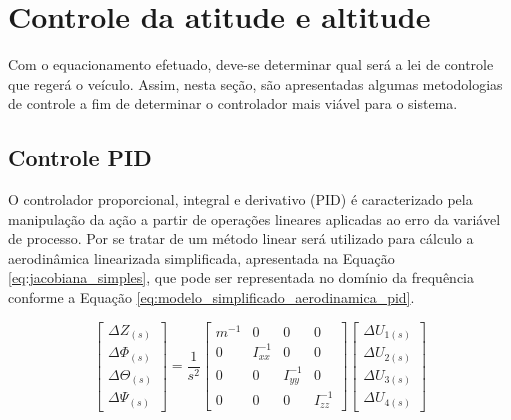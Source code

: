 \documentclass[main.tex]{subfiles}
\begin{document}
	
	\chapter{Controle da atitude e altitude}\label{chap:controle}
	
	Com o equacionamento efetuado, deve-se determinar qual será a lei de controle que regerá o veículo. Assim, nesta seção, são apresentadas algumas metodologias de controle a fim de determinar o controlador mais viável para o sistema.
	
	\section{Controle PID}\label{sec:controle_pid}
	
	O controlador proporcional, integral e derivativo (PID) é caracterizado pela manipulação da ação a partir de operações lineares aplicadas ao erro da variável de processo. Por se tratar de um método linear será utilizado para cálculo a aerodinâmica linearizada simplificada, apresentada na Equação \ref{eq:jacobiana_simples}, que pode ser representada no domínio da frequência conforme a Equação \ref{eq:modelo_simplificado_aerodinamica_pid}.
	
	\begin{equation}\label{eq:modelo_simplificado_aerodinamica_pid}
		\begin{bmatrix}
			\Delta Z_{(s)}\\
			\Delta \Phi_{(s)}\\
			\Delta \Theta_{(s)}\\
			\Delta \Psi_{(s)}
		\end{bmatrix} = \frac{1}{s^2}\begin{bmatrix}
			m^{-1} & 0 & 0 & 0\\
			
			0 & I_{xx}^{-1} & 0 & 0\\
			
			0 & 0 & I_{yy}^{-1} & 0\\
			
			0 & 0 & 0 & I_{zz}^{-1}
		\end{bmatrix}\begin{bmatrix}
			\Delta U_{1(s)}\\
			\Delta U_{2(s)}\\
			\Delta U_{3(s)}\\
			\Delta U_{4(s)}
		\end{bmatrix}
	\end{equation}
	
\end{document}
